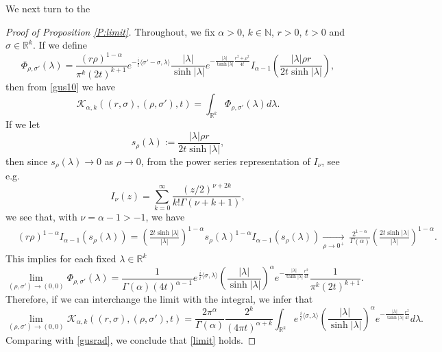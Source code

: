 \documentclass[11pt,a4paper]{amsart}
\def \R {\mathbb{R}}
\def \G{\Gamma}
\newcommand{\la}{\lambda}
\numberwithin{equation}{section}
\numberwithin{equation}{section}
\begin{document}
We next turn to the 
\begin{proof}[Proof of Proposition \ref{P:limit}]
Throughout, we fix $\alpha>0$, $k\in\mathbb N$, $r>0$, $t>0$ and $\sigma\in\mathbb R^k$.
If we define
\[
\Phi_{\rho,\sigma'}(\lambda) = \frac{(r\rho)^{1-\alpha}}{\pi^k (2t)^{k+1}}
e^{-\frac{i}{t}\langle \sigma'-\sigma,\lambda\rangle}
\frac{|\lambda|}{\sinh |\lambda|}
e^{-\frac{|\lambda|}{\tanh |\lambda|}
\frac{r^2+\rho^2}{4t}}
I_{\alpha-1}\!\left(
\frac{|\lambda|\rho r}{2t\sinh |\lambda|}
\right),
\]
then from \eqref{gus10} we have
\[
\mathscr K_{\alpha,k}((r,\sigma),(\rho,\sigma'),t)  = \int_{\R^k} \Phi_{\rho,\sigma'}(\lambda) d\la.
\]
If we let
\begin{equation}\label{s}
s_\rho(\lambda):= \frac{|\lambda|\rho r}{2t\sinh |\lambda|}, 
\end{equation}
then since $s_\rho(\lambda)\to0$ as $\rho\to0$, from the power series representation of $I_\nu$, see e.g. \cite[(5.7.1) on p. 108]{Le}
 \[
I_\nu(z) = \sum_{k=0}^\infty \frac{(z/2)^{\nu+2k}}{k! \G(\nu+k+1)},
\] 
we see that, with $\nu=\alpha-1> -1$, we have
\begin{align*}
& (r\rho)^{1-\alpha} I_{\alpha-1}(s_\rho(\lambda))
= \left(\frac{2t\sinh |\la|}{|\la|}\right)^{1-\alpha} s_\rho(\lambda)^{1-\alpha}I_{\alpha-1}(s_\rho(\lambda))
 \underset{\rho\to 0^+}{\longrightarrow}\  \frac{2^{1-\alpha}}{\Gamma(\alpha)}\left(\frac{2t \sinh |\la|}{|\la|}\right)^{1-\alpha}.
\end{align*}
This implies for each fixed $\lambda\in\mathbb R^k$ 
\begin{equation}\label{pointwise}
\lim_{(\rho,\sigma')\to(0,0)} \Phi_{\rho,\sigma'}(\lambda)
=\frac{1}{\Gamma(\alpha)(4t)^{\alpha-1}}e^{\,\frac{i}{t}\langle\sigma,\lambda\rangle}
\left(\frac{|\lambda|}{\sinh|\lambda|}\right)^{\alpha}
e^{-\frac{|\lambda|}{\tanh|\lambda|}\frac{r^2}{4t}} \frac{1}{\pi^k (2t)^{k+1}}.
\end{equation}
Therefore, if we can interchange the limit with the integral, we infer that
\[
\lim_{(\rho,\sigma')\to(0,0)} \mathscr K_{\alpha,k}((r,\sigma),(\rho,\sigma'),t)  = \frac{2\pi^\alpha}{\Gamma(\alpha)} \frac{2^{k}}{(4\pi t)^{\alpha+k}} \int_{\R^k} e^{\,\frac{i}{t}\langle\sigma,\lambda\rangle}
\left(\frac{|\lambda|}{\sinh|\lambda|}\right)^{\alpha}
e^{-\frac{|\lambda|}{\tanh|\lambda|}\frac{r^2}{4t}} d\la.
\]
Comparing with \eqref{gusrad}, we conclude that \eqref{limit} holds.


\end{proof}
\end{document}
